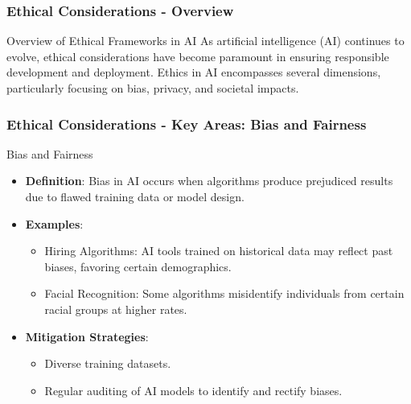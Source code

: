 \documentclass{beamer}
\begin{document}
\begin{frame}[fragile]
    \frametitle{Ethical Considerations - Overview}
    \begin{block}{Overview of Ethical Frameworks in AI}
        As artificial intelligence (AI) continues to evolve, ethical considerations have become paramount in ensuring responsible development and deployment. 
        Ethics in AI encompasses several dimensions, particularly focusing on bias, privacy, and societal impacts.
    \end{block}
\end{frame}

\begin{frame}[fragile]
    \frametitle{Ethical Considerations - Key Areas: Bias and Fairness}
    \begin{block}{Bias and Fairness}
        \begin{itemize}
            \item \textbf{Definition}: Bias in AI occurs when algorithms produce prejudiced results due to flawed training data or model design.
            \item \textbf{Examples}:
                \begin{itemize}
                    \item Hiring Algorithms: AI tools trained on historical data may reflect past biases, favoring certain demographics.
                    \item Facial Recognition: Some algorithms misidentify individuals from certain racial groups at higher rates.
                \end{itemize}
            \item \textbf{Mitigation Strategies}:
                \begin{itemize}
                    \item Diverse training datasets.
                    \item Regular auditing of AI models to identify and rectify biases.
                \end{itemize}
        \end{itemize}
    \end{block}
\end{frame}
\end{document}
